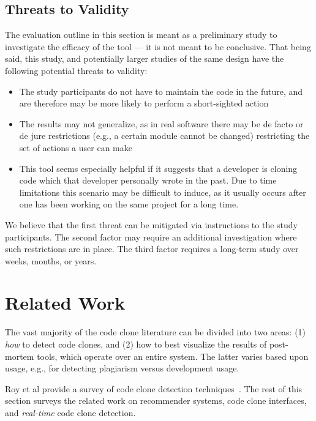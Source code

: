 \documentclass[preprint,10pt]{sigplanconf}
\begin{document}
\subsection{Threats to Validity}
The evaluation outline in this section is meant as a preliminary study
to investigate the efficacy of the tool --- it is not meant to be
conclusive. That being said, this study, and potentially larger
studies of the same design have the following potential threats to
validity:

\begin{itemize}
  \item The study participants do not have to maintain the code in the
    future, and are therefore may be more likely to perform a
    short-sighted action
  \item The results may not generalize, as in real software there may
    be de facto or de jure restrictions (e.g., a certain module cannot
    be changed) restricting the set of actions a user can make
  \item This tool seems especially helpful if it suggests that a
    developer is cloning code which that developer personally wrote in the
    past.  Due to time limitations this scenario may be difficult to
    induce, as it usually occurs after one has been working on the
    same project for a long time.
\end{itemize}

We believe that the first threat can be mitigated via instructions to
the study participants. The second factor may require an additional
investigation where such restrictions are in place.  The third factor
requires a long-term study over weeks, months, or years.

\section{Related Work}
\label{sec:related}

The vast majority of the code clone literature can be divided into two areas: (1)
\emph{how} to detect code clones, and (2) how to best visualize the
results of post-mortem tools, which operate over an entire system.
The latter varies based upon usage, e.g., for detecting plagiarism
versus development usage.

Roy et al provide a survey of code clone detection
techniques~\cite{Roy2009}. The rest of this section surveys the
related work on recommender systems, code clone interfaces, and
\emph{real-time} code clone detection.
\end{document}
